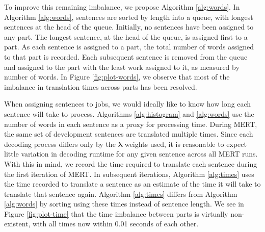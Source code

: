 \documentclass{pbml}
\begin{document}
%
%
To improve this remaining imbalance, we propose Algorithm \ref{alg:words}.
%
In Algorithm \ref{alg:words}, sentences are sorted by length into a queue, with longest sentences at the head of the queue.
%
Initially, no sentences have been assigned to any part.
%
The longest sentence, at the head of the queue, is assigned first to a part. As each sentence is assigned to a part, the total number of words assigned to that part is recorded. 
%
Each subsequent sentence is removed from the queue and assigned to the part with 
%
%
the least work assigned to it, as measured by number 
%
of words.
%
In Figure \ref{fig:plot-words}, we observe that most of the imbalance in translation times across parts has been resolved.




When assigning sentences to jobs, we would ideally like to know how long each sentence will take to process. Algorithms \ref{alg:histogram} and \ref{alg:words} use the number of words in each sentence as a proxy for processing time. During MERT, the same set of development sentences are translated multiple times. Since each decoding process differs only by the $\bm{\lambda}$ weights used, it is reasonable to expect little variation in decoding runtime for any given sentence across all MERT runs. With this in mind, we record the time required to translate each sentence during the first iteration of MERT. In subsequent iterations, Algorithm \ref{alg:times} uses the time recorded to translate a sentence as an estimate of the time it will take to translate that sentence again. Algorithm \ref{alg:times} differs from Algorithm \ref{alg:words} by sorting using these times instead of sentence length.
%
We see in Figure \ref{fig:plot-time} that the time imbalance between parts is virtually non-existent, with all times now within 0.01 seconds of each other.

\end{document}
